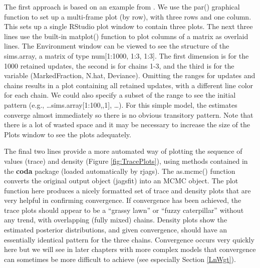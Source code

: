 \documentclass[
]{krantz}
\begin{document}
The first approach is based on an example from \citet{kéry_2010}. We use the par() graphical function to set up a multi-frame plot (by row), with three rows and one column. This sets up a single RStudio plot window to contain three plots. The next three lines use the built-in matplot() function to plot columns of a matrix as overlaid lines. The Environment window can be viewed to see the structure of the sims.array, a matrix of type num{[}1:1000, 1:3, 1:3{]}. The first dimension is for the 1000 retained updates, the second is for chains 1-3, and the third is for the variable (MarkedFraction, N.hat, Deviance). Omitting the ranges for updates and chains results in a plot containing all retained updates, with a different line color for each chain. We could also specify a subset of the range to see the initial pattern (e.g., \ldots sims.array{[}1:100,,1{]}, \ldots). For this simple model, the estimates converge almost immediately so there is no obvious transitory pattern. Note that there is a lot of wasted space and it may be necessary to increase the size of the Plots window to see the plots adequately.

The final two lines provide a more automated way of plotting the sequence of values (trace) and density (Figure \ref{fig:TracePlots}), using methods contained in the \textbf{coda} \citep{R-coda} package (loaded automatically by rjags). The as.mcmc() function converts the original output object (jagsfit) into an MCMC object. The plot function here produces a nicely formatted set of trace and density plots that are very helpful in confirming convergence. If convergence has been achieved, the trace plots should appear to be a ``grassy lawn'' or ``fuzzy caterpillar'' without any trend, with overlapping (fully mixed) chains. Density plots show the estimated posterior distributions, and given convergence, should have an essentially identical pattern for the three chains. Convergence occurs very quickly here but we will see in later chapters with more complex models that convergence can sometimes be more difficult to achieve (see especially Section \ref{LnWgt}).
\end{document}

